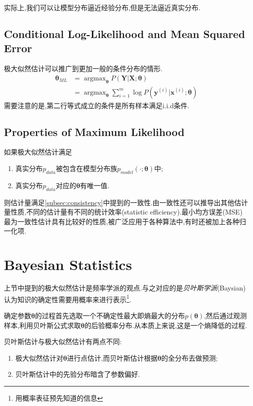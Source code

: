 实际上,我们可以让模型分布逼近经验分布,但是无法逼近真实分布.

\subsection{Conditional Log-Likelihood and Mean Squared Error}

极大似然估计可以推广到更加一般的条件分布的情形.
\begin{equation}\begin{split}
{\bm\theta}_{ML}&=\mathop{\arg\max}_{\bm\theta} P(\bm Y|\bm X;{\bm\theta})\\
&=\mathop{\arg\max}_{\bm\theta}\sum_{i=1}^m\log P(\bm y^{(i)}|\bm x^{(i)};{\bm\theta})
\end{split}\end{equation}
需要注意的是,第二行等式成立的条件是所有样本满足i.i.d条件.

\subsection{Properties of Maximum Likelihood}

如果极大似然估计满足
\begin{enumerate}
\item 真实分布$p_{data}$被包含在模型分布族$p_{model}(\cdot;{\bm\theta})$中;
\item 真实分布$p_{data}$对应的${\bm\theta}$有唯一值.
\end{enumerate}
则估计量满足\ref{subsec:consistency}中提到的一致性.由一致性还可以推导出其他估计量性质,不同的估计量有不同的统计效率(statistic efficiency).最小均方误差(MSE)最为一致性估计具有比较好的性质,被广泛应用于各种算法中,有时还被加上各种归一化项.

\section{Bayesian Statistics}

上节中提到的极大似然估计是频率学派的观点.与之对应的是\textit{贝叶斯学派}(Baysian)认为知识的确定性需要用概率来进行表示\footnote{用概率表征预先知道的信息}.

确定参数${\bm\theta}$的过程首先选取一个不确定性最大即熵最大的分布$p({\bm\theta})$,然后通过观测样本,利用贝叶斯公式求取${\bm\theta}$的后验概率分布.从本质上来说,这是一个熵降低的过程.

贝叶斯估计与极大似然估计有两点不同:
\begin{enumerate}
\item 极大似然估计对${\bm\theta}$进行点估计,而贝叶斯估计根据${\bm\theta}$的全分布去做预测;
\item 贝叶斯估计中的先验分布暗含了参数偏好.
\end{enumerate}

